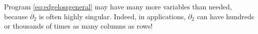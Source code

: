 



Program \eqref{eq:edgelossgeneral} may have many more variables than needed, because $\partial_2$ is often highly singular.  Indeed, in  applications, $\partial_2$ can have hundreds or thousands of times as many columns as rows!

